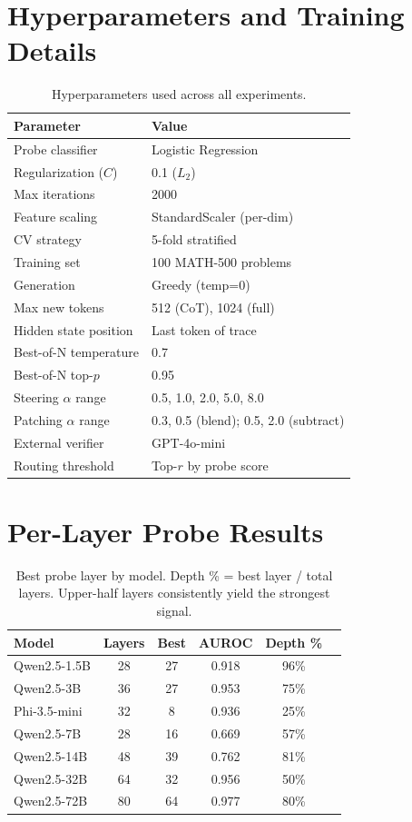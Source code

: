 \documentclass[11pt]{article}
\newcommand{\modelsmall}{Qwen2.5-3B}
\newcommand{\modelmed}{Qwen2.5-7B}
\newcommand{\modellarge}{Qwen2.5-14B}
\newcommand{\modelphi}{Phi-3.5-mini}
\begin{document}
\section{Hyperparameters and Training Details}
\label{app:hyperparams}

\begin{table}[h]
\centering
\small
\begin{tabular}{ll}
\toprule
\textbf{Parameter} & \textbf{Value} \\
\midrule
Probe classifier & Logistic Regression \\
Regularization ($C$) & 0.1 ($L_2$) \\
Max iterations & 2000 \\
Feature scaling & StandardScaler (per-dim) \\
CV strategy & 5-fold stratified \\
Training set & 100 MATH-500 problems \\
Generation & Greedy (temp=0) \\
Max new tokens & 512 (CoT), 1024 (full) \\
Hidden state position & Last token of trace \\
\midrule
Best-of-N temperature & 0.7 \\
Best-of-N top-$p$ & 0.95 \\
Steering $\alpha$ range & 0.5, 1.0, 2.0, 5.0, 8.0 \\
Patching $\alpha$ range & 0.3, 0.5 (blend); 0.5, 2.0 (subtract) \\
\midrule
External verifier & GPT-4o-mini \\
Routing threshold & Top-$r$ by probe score \\
\bottomrule
\end{tabular}
\caption{Hyperparameters used across all experiments.}
\label{tab:hyperparams}
\end{table}

\section{Per-Layer Probe Results}
\label{app:layers}

\begin{table}[h]
\centering
\small
\begin{tabular}{lccccc}
\toprule
\textbf{Model} & \textbf{Layers} & \textbf{Best} & \textbf{AUROC} & \textbf{Depth \%} \\
\midrule
Qwen2.5-1.5B & 28 & 27 & 0.918 & 96\% \\
\modelsmall & 36 & 27 & 0.953 & 75\% \\
\modelphi & 32 & 8 & 0.936 & 25\% \\
\modelmed & 28 & 16 & 0.669 & 57\% \\
\modellarge & 48 & 39 & 0.762 & 81\% \\
Qwen2.5-32B & 64 & 32 & 0.956 & 50\% \\
Qwen2.5-72B & 80 & 64 & 0.977 & 80\% \\
\bottomrule
\end{tabular}
\caption{Best probe layer by model. Depth \% = best layer / total layers. Upper-half layers consistently yield the strongest signal.}
\label{tab:layer_details}
\end{table}
\end{document}

